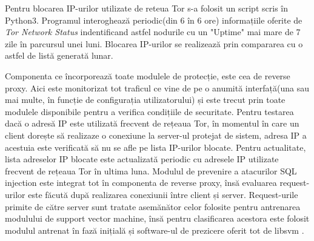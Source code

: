 Pentru blocarea IP-urilor utilizate de reteua Tor s-a folosit un script scris în Python3. Programul interoghează periodic(din 6 în 6 ore) informațiile oferite de \textit{Tor Network Status} \cite{tot_status} indentificand astfel nodurile cu un "Uptime" mai mare de 7 zile în parcursul unei luni. Blocarea IP-urilor se realizează prin compararea cu o astfel de listă generată lunar. 

Componenta ce încorporează toate modulele de protecție, este cea de reverse proxy. Aici este monitorizat tot traficul ce vine de pe o anumită interfață(una sau mai multe, în funcție de configurația utilizatorului) și este trecut prin toate modulele disponibile pentru a verifica condițiile de securitate. Pentru testarea dacă o adresă IP este utilizată frecvent de rețeaua Tor, în momentul în care un client dorește să realizaze o conexiune la server-ul protejat de sistem, adresa IP a acestuia este verificată să nu se afle pe lista IP-urilor blocate. Pentru actualitate, lista adreselor IP blocate este actualizată periodic cu adresele IP utilizate frecvent de rețeaua Tor în ultima luna. Modulul de prevenire a atacurilor SQL injection este integrat tot în componenta de reverse proxy, însă evaluarea request-urilor este făcută după realizarea conexiunii între client și server. Request-urile primite de către server sunt tratate asemănător celor folosite pentru antrenarea modulului de support vector machine, însă pentru clasificarea acestora este folosit modulul antrenat în fază inițială și software-ul de prezicere oferit tot de libsvm \cite{libsvm}.
	
	

	





